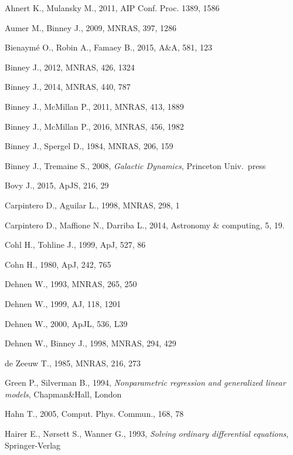 \documentclass[12pt]{article}
\begin{document}
\begin{thebibliography}{99} \setlength{\parskip}{2pt} \setlength{\itemsep}{2pt}

Ahnert K., Mulansky M., 2011, AIP Conf. Proc. 1389, 1586

Aumer M., Binney J., 2009, MNRAS, 397, 1286

Bienaym\'e O., Robin A., Famaey B., 2015, A\&A, 581, 123

Binney J., 2012, MNRAS, 426, 1324

Binney J., 2014, MNRAS, 440, 787

Binney J., McMillan P., 2011, MNRAS, 413, 1889

Binney J., McMillan P., 2016, MNRAS, 456, 1982

Binney J., Spergel D., 1984, MNRAS, 206, 159

Binney J., Tremaine S., 2008, \textsl{Galactic Dynamics}, Princeton Univ.\ press

Bovy J., 2015, ApJS, 216, 29

Carpintero D., Aguilar L., 1998, MNRAS, 298, 1

Carpintero D., Maffione N., Darriba L., 2014, Astronomy \& computing, 5, 19.

Cohl H., Tohline J., 1999, ApJ, 527, 86

Cohn H., 1980, ApJ, 242, 765

Dehnen W., 1993, MNRAS, 265, 250

Dehnen W., 1999, AJ, 118, 1201

Dehnen W., 2000, ApJL, 536, L39

Dehnen W., Binney J., 1998, MNRAS, 294, 429

de Zeeuw T., 1985, MNRAS, 216, 273

Green P., Silverman B., 1994, \textsl{Nonparametric regression and generalized linear models}, Chapman\&Hall, London

Hahn T., 2005, Comput. Phys. Commun., 168, 78

Hairer E., N{\o}rsett S., Wanner G., 1993, \textsl{Solving ordinary differential equations}, Springer-Verlag


\end{thebibliography}
\end{document}
